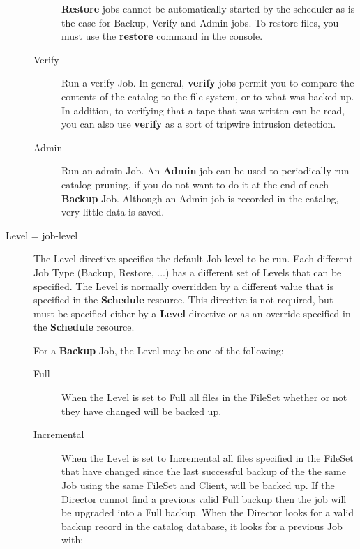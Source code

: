 \begin{description}
\begin{description}
   {\bf Restore} jobs cannot be
   automatically started by the scheduler as is the case for Backup, Verify
   and Admin jobs. To restore files, you must use the {\bf restore} command
   in the console.


\item [Verify]
   Run a verify Job. In general, {\bf verify}  jobs permit you to compare the
   contents of the catalog  to the file system, or to what was backed up. In
   addition,  to verifying that a tape that was written can be read,  you can
   also use {\bf verify} as a sort of tripwire  intrusion detection.  

\item [Admin]
   Run an admin Job. An {\bf Admin} job can  be used to periodically run catalog
   pruning, if you  do not want to do it at the end of each {\bf Backup}  Job.
   Although an Admin job is recorded in the  catalog, very little data is saved. 
\end{description}

\label{Level}

\item [Level = \lt{}job-level\gt{}]
   The Level directive specifies the default Job level to be run.  Each
   different Job Type (Backup, Restore, ...) has a different set of Levels
   that can be specified.  The Level is normally overridden by a different
   value that is specified in the {\bf Schedule} resource.  This directive
   is not required, but must be specified either by a {\bf Level} directive
   or as an override specified in the {\bf Schedule} resource.

For a {\bf Backup} Job, the Level may be one of the  following:  

\begin{description}

\item [Full]
   When the Level is set to Full all files in the FileSet whether or not
   they have changed will be backed up.

\item [Incremental]
   When the Level is set to Incremental all files specified in the FileSet
   that have changed since the last successful backup of the the same Job
   using the same FileSet and Client, will be backed up.  If the Director
   cannot find a previous valid Full backup then the job will be upgraded
   into a Full backup.  When the Director looks for a valid backup record
   in the catalog database, it looks for a previous Job with:


\end{description}
\end{description}
